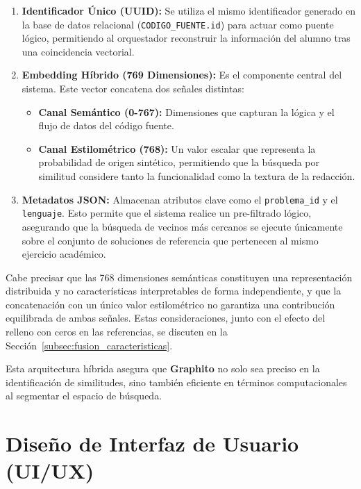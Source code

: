 \begin{enumerate}
    \item \textbf{Identificador Único (UUID):} Se utiliza el mismo identificador generado en la base de datos relacional (\texttt{CODIGO\_FUENTE.id}) para actuar como puente lógico, permitiendo al orquestador reconstruir la información del alumno tras una coincidencia vectorial.
    
    \item \textbf{Embedding Híbrido (769 Dimensiones):} Es el componente central del sistema. Este vector concatena dos señales distintas: 
    \begin{itemize}
        \item \textbf{Canal Semántico (0-767):} Dimensiones que capturan la lógica y el flujo de datos del código fuente.
        \item \textbf{Canal Estilométrico (768):} Un valor escalar que representa la probabilidad de origen sintético, permitiendo que la búsqueda por similitud considere tanto la funcionalidad como la textura de la redacción.
    \end{itemize}

    \item \textbf{Metadatos JSON:} Almacenan atributos clave como el \texttt{problema\_id} y el \texttt{lenguaje}. Esto permite que el sistema realice un pre-filtrado lógico, asegurando que la búsqueda de vecinos más cercanos se ejecute únicamente sobre el conjunto de soluciones de referencia que pertenecen al mismo ejercicio académico.
\end{enumerate}

Cabe precisar que las 768 dimensiones semánticas constituyen una representación distribuida y no características interpretables de forma independiente, y que la concatenación con un único valor estilométrico no garantiza una contribución equilibrada de ambas señales. Estas consideraciones, junto con el efecto del relleno con ceros en las referencias, se discuten en la Sección~\ref{subsec:fusion_caracteristicas}.

Esta arquitectura híbrida asegura que \textbf{Graphito} no solo sea preciso en la identificación de similitudes, sino también eficiente en términos computacionales al segmentar el espacio de búsqueda.
\section{Diseño de Interfaz de Usuario (UI/UX)}

